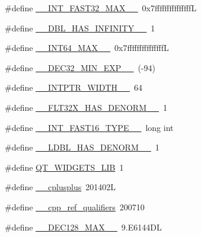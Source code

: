 \begin{DoxyCompactItemize}
\item 
\#define \hyperlink{cmake-build-debug_2babel__client__autogen_2moc__predefs_8h_a84479d2bbe1d7286f406fcc302f41376}{\+\_\+\+\_\+\+I\+N\+T\+\_\+\+F\+A\+S\+T32\+\_\+\+M\+A\+X\+\_\+\+\_\+}~0x7fffffffffffffffL
\item 
\#define \hyperlink{cmake-build-debug_2babel__client__autogen_2moc__predefs_8h_a3dd03066dbb351dfa51353c80a7902a2}{\+\_\+\+\_\+\+D\+B\+L\+\_\+\+H\+A\+S\+\_\+\+I\+N\+F\+I\+N\+I\+T\+Y\+\_\+\+\_\+}~1
\item 
\#define \hyperlink{cmake-build-debug_2babel__client__autogen_2moc__predefs_8h_aa3f186f612efe5edfcc371c95617f06f}{\+\_\+\+\_\+\+I\+N\+T64\+\_\+\+M\+A\+X\+\_\+\+\_\+}~0x7fffffffffffffffL
\item 
\#define \hyperlink{cmake-build-debug_2babel__client__autogen_2moc__predefs_8h_a79e289c54a8c9851b2b118d442bbc26c}{\+\_\+\+\_\+\+D\+E\+C32\+\_\+\+M\+I\+N\+\_\+\+E\+X\+P\+\_\+\+\_\+}~(-\/94)
\item 
\#define \hyperlink{cmake-build-debug_2babel__client__autogen_2moc__predefs_8h_a8394afe92148ddbdf0e0697978cd1382}{\+\_\+\+\_\+\+I\+N\+T\+P\+T\+R\+\_\+\+W\+I\+D\+T\+H\+\_\+\+\_\+}~64
\item 
\#define \hyperlink{cmake-build-debug_2babel__client__autogen_2moc__predefs_8h_a97163404b3b71f857e35be74607f88f7}{\+\_\+\+\_\+\+F\+L\+T32\+X\+\_\+\+H\+A\+S\+\_\+\+D\+E\+N\+O\+R\+M\+\_\+\+\_\+}~1
\item 
\#define \hyperlink{cmake-build-debug_2babel__client__autogen_2moc__predefs_8h_a6a4d11835d03027f3929b84fe7b55bf6}{\+\_\+\+\_\+\+I\+N\+T\+\_\+\+F\+A\+S\+T16\+\_\+\+T\+Y\+P\+E\+\_\+\+\_\+}~long int
\item 
\#define \hyperlink{cmake-build-debug_2babel__client__autogen_2moc__predefs_8h_a3c7f3130e367d47bcc27a0a41278155e}{\+\_\+\+\_\+\+L\+D\+B\+L\+\_\+\+H\+A\+S\+\_\+\+D\+E\+N\+O\+R\+M\+\_\+\+\_\+}~1
\item 
\#define \hyperlink{cmake-build-debug_2babel__client__autogen_2moc__predefs_8h_a3764f041b8bf4c5ebd0bf19c071f416c}{Q\+T\+\_\+\+W\+I\+D\+G\+E\+T\+S\+\_\+\+L\+IB}~1
\item 
\#define \hyperlink{cmake-build-debug_2babel__client__autogen_2moc__predefs_8h_a1b391bc7ed92f79666c4a5d840aa1edd}{\+\_\+\+\_\+cplusplus}~201402L
\item 
\#define \hyperlink{cmake-build-debug_2babel__client__autogen_2moc__predefs_8h_af73192acc2dd2095bd3524ca5ee9dca9}{\+\_\+\+\_\+cpp\+\_\+ref\+\_\+qualifiers}~200710
\item 
\#define \hyperlink{cmake-build-debug_2babel__client__autogen_2moc__predefs_8h_aaab7817ee2e4bb88b5178e101e7ab2a6}{\+\_\+\+\_\+\+D\+E\+C128\+\_\+\+M\+A\+X\+\_\+\+\_\+}~9.\+E6144\+DL

\end{DoxyCompactItemize}
